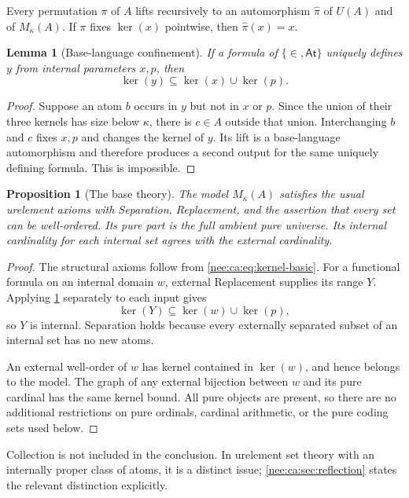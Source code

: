 \documentclass[11pt,letterpaper]{article}
\numberwithin{equation}{section}
\theoremstyle{plain}
\newtheorem{lemma}[lemma]{Lemma}
\newtheorem{proposition}[proposition]{Proposition}
\theoremstyle{definition}
\theoremstyle{remark}
\newcommand{\At}{\mathsf{At}}
\newcommand{\kerat}{\operatorname{ker}}
\newcommand{\Mk}{M_\kappa(A)}
\begin{document}
Every permutation $\pi$ of $A$ lifts recursively to an automorphism $\widehat\pi$ of $U(A)$ and of $\Mk$. If $\pi$ fixes $\kerat(x)$ pointwise, then $\widehat\pi(x)=x$.

\begin{lemma}[Base-language confinement]\label{nee:ca:lem:base-confinement}
If a formula of $\{\in,\At\}$ uniquely defines $y$ from internal parameters $x,p$, then
\[
\kerat(y)\subseteq\kerat(x)\cup\kerat(p).
\]
\end{lemma}
\begin{proof}
Suppose an atom $b$ occurs in $y$ but not in $x$ or $p$. Since the union of their three kernels has size below $\kappa$, there is $c\in A$ outside that union. Interchanging $b$ and $c$ fixes $x,p$ and changes the kernel of $y$. Its lift is a base-language automorphism and therefore produces a second output for the same uniquely defining formula. This is impossible.
\end{proof}

\begin{proposition}[The base theory]\label{nee:ca:prop:base}
The model $\Mk$ satisfies the usual urelement axioms with Separation, Replacement, and the assertion that every set can be well-ordered. Its pure part is the full ambient pure universe. Its internal cardinality for each internal set agrees with the external cardinality.
\end{proposition}
\begin{proof}
The structural axioms follow from \eqref{nee:ca:eq:kernel-basic}. For a functional formula on an internal domain $w$, external Replacement supplies its range $Y$. Applying \cref{nee:ca:lem:base-confinement} separately to each input gives
\[
\kerat(Y)\subseteq\kerat(w)\cup\kerat(p),
\]
so $Y$ is internal. Separation holds because every externally separated subset of an internal set has no new atoms.

An external well-order of $w$ has kernel contained in $\kerat(w)$, and hence belongs to the model. The graph of any external bijection between $w$ and its pure cardinal has the same kernel bound. All pure objects are present, so there are no additional restrictions on pure ordinals, cardinal arithmetic, or the pure coding sets used below.
\end{proof}

Collection is not included in the conclusion. In urelement set theory with an internally proper class of atoms, it is a distinct issue; \cref{nee:ca:sec:reflection} states the relevant distinction explicitly.
\end{document}
